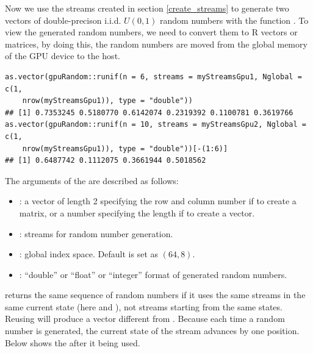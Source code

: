 \documentclass[article,nojss]{jss}\usepackage[]{graphicx}\usepackage[]{color}
\makeatletter
\newenvironment{kframe}{%
 \def\at@end@of@kframe{}%
 \ifinner\ifhmode%
  \def\at@end@of@kframe{\end{minipage}}%
  \begin{minipage}{\columnwidth}%
 \fi\fi%
 \def\FrameCommand##1{\hskip\@totalleftmargin \hskip-\fboxsep
 \colorbox{shadecolor}{##1}\hskip-\fboxsep
     \hskip-\linewidth \hskip-\@totalleftmargin \hskip\columnwidth}%
 \MakeFramed {\advance\hsize-\width
   \@totalleftmargin\z@ \linewidth\hsize
   \@setminipage}}%
 {\par\unskip\endMakeFramed%
 \at@end@of@kframe}
\newenvironment{knitrout}{}{} %
\newcommand{\fct}[1]{\code{#1()}}
\makeatother
\begin{document}
Now we use the streams created in section \ref{create_streams} to generate two vectors of double-precison i.i.d. $U(0,1)$ random numbers with the function \fct{runif}. To view the generated random numbers, we need to convert them to R vectors or matrices, by doing this, the random numbers are moved from the global memory of the GPU device to the host.
\begin{knitrout}
\color{fgcolor}\begin{kframe}
\begin{verbatim}
as.vector(gpuRandom::runif(n = 6, streams = myStreamsGpu1, Nglobal = c(1,
    nrow(myStreamsGpu1)), type = "double"))
## [1] 0.7353245 0.5180770 0.6142074 0.2319392 0.1100781 0.3619766
as.vector(gpuRandom::runif(n = 10, streams = myStreamsGpu2, Nglobal = c(1,
    nrow(myStreamsGpu1)), type = "double"))[-(1:6)]
## [1] 0.6487742 0.1112075 0.3661944 0.5018562
\end{verbatim}
\end{kframe}
\end{knitrout}
The arguments of the \fct{gpuRandom::runif} are described as follows:
\begin{itemize}
  \item {}: a vector of length 2 specifying the row and column number if to create a matrix, or a number specifying the length if to create a vector.
  \item {}: streams for random number generation.
  \item {}: global index space. Default is set as $(64,8)$.
  \item {}: ``double'' or ``float'' or ``integer'' format of generated random numbers.
\end{itemize}
\fct{runif} returns the same sequence of random numbers if it uses the same streams in the same current state (here  and ), not streams starting from the same states. Reusing  will produce a vector different from . Because each time a random number is generated, the current state of the stream advances by one position. Below shows the  after it being used.
\end{document}
